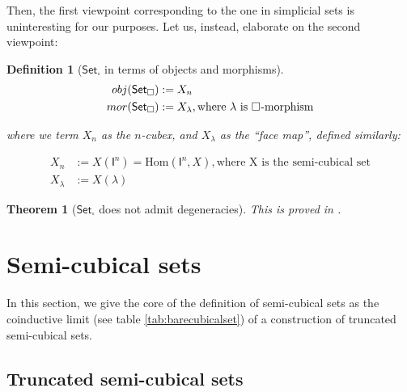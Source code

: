 \documentclass[10pt, titlepage]{amsart}
\newtheorem{definition}{Definition}
\newtheorem{theorem}{Theorem}
\newcommand{\Cube}[1]{\ensuremath{\boldsymbol{\square^{#1}}}}
\newcommand{\I}[1]{\ensuremath{\mathsf{I}^{#1}}}
\newcommand{\CSet}{\ensuremath{\mathsf{Set}_{\boldsymbol{\square}}}}
\begin{document}
Then, the first viewpoint corresponding to the one in simplicial sets is uninteresting for our purposes. Let us, instead, elaborate on the second viewpoint:

\begin{definition}[$\CSet$ in terms of objects and morphisms]
  \begin{align*}
    obj(\CSet) & := X_n                                                   \\
    mor(\CSet) & := X_\lambda, \text{where $\lambda$ is \Cube{}-morphism}
  \end{align*}

  where we term $X_n$ as the $n$-cubex, and $X_\lambda$ as the ``face map'', defined similarly:

  \begin{align*}
    X_n       & := X(\I{n}) = \text{Hom}(\I{n}, X), \text{where X is the semi-cubical set} \\
    X_\lambda & := X(\lambda)
  \end{align*}
\end{definition}

\begin{theorem}[$\CSet$ does not admit degeneracies]
  This is proved in \cite{Antolini00}.
\end{theorem}

\section{Semi-cubical sets}

In this section, we give the core of the definition of semi-cubical
sets as the coinductive limit (see table \ref{tab:barecubicalset}) of a
construction of truncated semi-cubical sets.

\subsection{Truncated semi-cubical sets}
\end{document}
